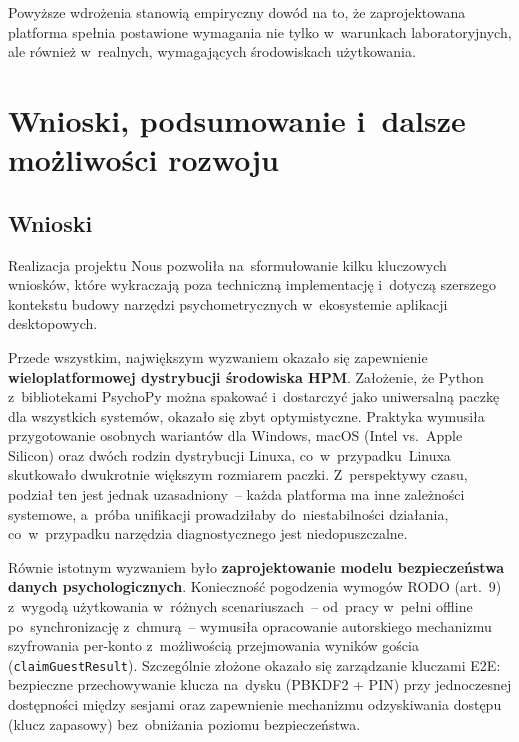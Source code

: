 \documentclass[12pt, a4paper, oneside]{report}
\begin{document}
Powyższe wdrożenia stanowią empiryczny dowód na to, że zaprojektowana platforma spełnia postawione wymagania nie tylko w~warunkach laboratoryjnych, ale również w~realnych, wymagających środowiskach użytkowania.


\chapter{Wnioski, podsumowanie i~dalsze możliwości rozwoju}
\label{chap:podsumowanie}


\section{Wnioski}
\label{sec:wnioski}

Realizacja projektu Nous pozwoliła na~sformułowanie kilku kluczowych wniosków, które wykraczają poza techniczną implementację i~dotyczą szerszego kontekstu budowy narzędzi psychometrycznych w~ekosystemie aplikacji desktopowych.

Przede wszystkim, największym wyzwaniem okazało się zapewnienie \textbf{wieloplatformowej dystrybucji środowiska HPM}. Założenie, że Python z~bibliotekami PsychoPy można spakować i~dostarczyć jako uniwersalną paczkę dla wszystkich systemów, okazało się zbyt optymistyczne. Praktyka wymusiła przygotowanie osobnych wariantów dla Windows, macOS (Intel vs.~Apple Silicon) oraz dwóch rodzin dystrybucji Linuxa, co~w~przypadku~Linuxa skutkowało dwukrotnie większym rozmiarem paczki. Z~perspektywy czasu, podział ten jest jednak uzasadniony~-- każda platforma ma inne zależności systemowe, a~próba unifikacji prowadziłaby do~niestabilności działania, co~w~przypadku narzędzia diagnostycznego jest niedopuszczalne.

Równie istotnym wyzwaniem było \textbf{zaprojektowanie modelu bezpieczeństwa danych psychologicznych}. Konieczność pogodzenia wymogów RODO (art.~9) z~wygodą użytkowania w~różnych scenariuszach~-- od~pracy w~pełni offline po~synchronizację z~chmurą~-- wymusiła opracowanie autorskiego mechanizmu szyfrowania per-konto z~możliwością przejmowania wyników gościa (\texttt{claimGuestResult}). Szczególnie złożone okazało się zarządzanie kluczami E2E: bezpieczne przechowywanie klucza na~dysku (PBKDF2 + PIN) przy jednoczesnej dostępności między sesjami oraz zapewnienie mechanizmu odzyskiwania dostępu (klucz zapasowy) bez~obniżania poziomu bezpieczeństwa.
\end{document}
